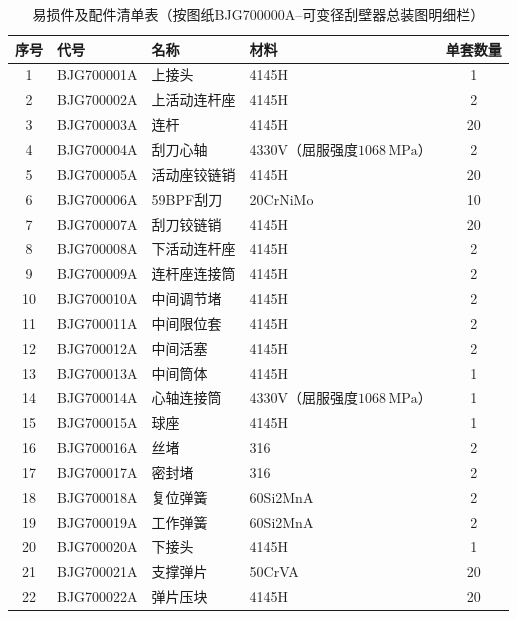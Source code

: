 \begin{table}[htbp]
    \centering
    \caption{易损件及配件清单表（按图纸BJG700000A--可变径刮壁器总装图明细栏）}
    \label{tab:parts_list}
    \footnotesize %
    \setlength{\tabcolsep}{4pt} %
    \renewcommand{\arraystretch}{1.35} %
    \begin{tabular}{clllc}
        \toprule
        序号 & 代号 & 名称 & 材料 & 单套数量 \\
        \midrule
        1  & BJG700001A & 上接头 & 4145H & 1 \\
        2  & BJG700002A & 上活动连杆座 & 4145H & 2 \\
        3  & BJG700003A & 连杆 & 4145H & 20 \\
        4  & BJG700004A & 刮刀心轴 & 4330V（屈服强度$1068\,\mathrm{MPa}$） & 2 \\
        5  & BJG700005A & 活动座铰链销 & 4145H & 20 \\
        6  & BJG700006A & 59BPF刮刀 & 20CrNiMo & 10 \\
        7  & BJG700007A & 刮刀铰链销 & 4145H & 20 \\
        8  & BJG700008A & 下活动连杆座 & 4145H & 2 \\
        9  & BJG700009A & 连杆座连接筒 & 4145H & 2 \\
        10 & BJG700010A & 中间调节堵 & 4145H & 2 \\
        11 & BJG700011A & 中间限位套 & 4145H & 2 \\
        12 & BJG700012A & 中间活塞 & 4145H & 2 \\
        13 & BJG700013A & 中间筒体 & 4145H & 1 \\
        14 & BJG700014A & 心轴连接筒 & 4330V（屈服强度$1068\,\mathrm{MPa}$） & 1 \\
        15 & BJG700015A & 球座 & 4145H & 1 \\
        16 & BJG700016A & 丝堵 & 316 & 2 \\
        17 & BJG700017A & 密封堵 & 316 & 2 \\
        18 & BJG700018A & 复位弹簧 & 60Si2MnA & 2 \\
        19 & BJG700019A & 工作弹簧 & 60Si2MnA & 2 \\
        20 & BJG700020A & 下接头 & 4145H & 1 \\
        21 & BJG700021A & 支撑弹片 & 50CrVA & 20 \\
        22 & BJG700022A & 弹片压块 & 4145H & 20 \\

\end{tabular}
\end{table}
